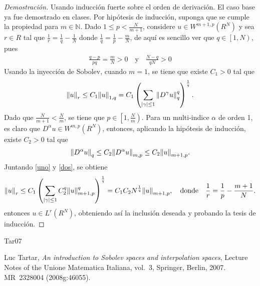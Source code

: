 \documentclass[10pt,a4paper]{report}
\newcommand{\abs}[2][y]{\if#1y\left\fi\lvert#2\if#1y\right\fi\rvert}
\newcommand{\norm}[2][y]{{\if#1y\left\fi\lVert#2\if#1y\right\fi\rVert}}
\theoremstyle{definition}
\numberwithin{equation}{problem}
\providecommand{\abs}[1]{\left\lvert#1\right\rvert}
\providecommand{\norm}[1]{\left\lVert#1\right\rVert}
\begin{document}
    \begin{proof}[\textcolor{rojo}{Demostración}]
    	Usando inducción fuerte sobre el orden de derivación. El caso base ya fue demostrado en clases. Por hipótesis de inducción, suponga que se cumple la propiedad para $m\in \mathbb{N}$. Dado $1\leq p < \frac{N}{m+1}$, considere $u\in W^{m+1,p}(R^{N})$ y sea $r\in R$ tal que $\frac{1}{r} = \frac{1}{q} - \frac{1}{N}$ donde $\frac{1}{q} = \frac{1}{p}-\frac{m}{N}$, de aquí es sencillo ver que $q\in\left[1,N\right)$, pues
    	\begin{align*}
    		\frac{q-p}{pq} = \frac{m}{N}>0\quad \text{y} \quad \frac{N-q}{qN}>0
    	\end{align*}
        Usando la inyección de Sobolev, cuando $m=1$, se tiene que existe $C_{1}>0$ tal que
        \begin{align}\label{uno}
        	\norm{u}_{r}\leq C_{1}\norm{u}_{1,q} = C_{1}\left(\sum_{\abs{\gamma}\leq1}\norm{D^{\gamma}u}^{q}_{q}\right)^{\frac{1}{q}}.
        \end{align}
        Dado que $\frac{N}{m+1}<\frac{N}{m}$, se tiene que $p\in\left[1,\frac{N}{m}\right)$. Para un multi-indice $\alpha$ de orden 1, es claro que $D^{\alpha}u\in W^{m,p}(R^{N})$, entonces, aplicando la hipótesis de inducción, existe $C_{2}>0$ tal que 
        \begin{align}\label{dos}
        	\norm{D^{\alpha}u}_{q} \leq C_{2}\norm{D^{\alpha}u}_{m,p}\leq C_{2}\norm{u}_{m+1,p}.
        \end{align}
        Juntando \eqref{uno} y \eqref{dos}, se obtiene 
        \begin{align*}
        	\norm{u}_{r} \leq C_{1}\left(\sum_{\abs{\gamma}\leq1} C^{q}_{2}\norm{u}^{q}_{m+1,p}\right)^{\frac{1}{q}} = C_{1}C_{2}N^{\frac{1}{q}}\norm{u}_{m+1,p}, \quad\text{donde}\quad \frac{1}{r} = \frac{1}{p} - \frac{m+1}{N}.
        \end{align*}
    entonces $u\in L^{r}(R^{N})$, obteniendo así la inclusión deseada y probando la tesis de inducción.
    \end{proof}
    

    
    \begin{thebibliography}{Tar07}
    	
    	Luc Tartar, \emph{An introduction to {S}obolev spaces and interpolation spaces}, Lecture Notes of the Unione Matematica Italiana, vol.~3, Springer, Berlin, 2007. MR~2328004 (2008g:46055).
    	
    \end{thebibliography}
\end{document}
